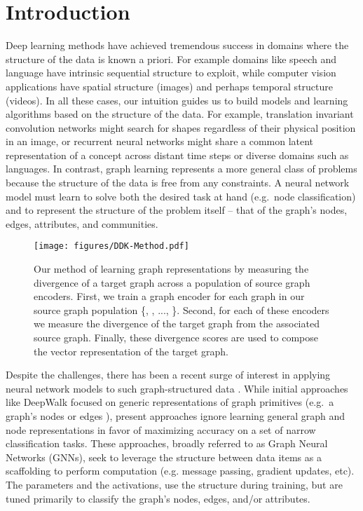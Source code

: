 \documentclass[sigconf]{acmart}
\begin{document}

\maketitle

\section{Introduction}

Deep learning methods have achieved tremendous success in domains where the structure of the data is known a priori.
For example domains like speech and language have intrinsic sequential structure to exploit, while computer vision applications have spatial structure (images) and perhaps temporal structure (videos).
In all these cases, our intuition guides us to build models and learning algorithms based on the structure of the data.
For example, translation invariant convolution networks might search for shapes regardless of their physical position in an image, or recurrent neural networks might share a common latent representation of a concept across distant time steps or diverse domains such as languages.
In contrast, graph learning represents a more general class of problems because the structure of the data is free from any constraints.
A neural network model must learn to solve both the desired task at hand (e.g.\ node classification) and to represent the structure of the problem itself -- that of the graph's nodes, edges, attributes, and communities.

\begin{figure}[t]
\texttt{[image: figures/DDK-Method.pdf]}
\caption{Our method of learning graph representations by measuring the divergence of a target graph across a population of source graph encoders.
First, we train a graph encoder for each graph in our source graph population \{, , ..., \}.
Second, for each of these encoders we measure the divergence of the target graph from the associated source graph.
Finally, these divergence scores are used to compose the vector representation of the target graph.}
\label{fig:method}
\end{figure}

Despite the challenges, there has been a recent surge of interest in applying neural network models to such graph-structured data \cite{deepwalk, kipf-gcn,hamilton2017inductive,velickovic2017graph,zhu2018deep}.
While initial approaches like DeepWalk \cite{deepwalk} focused on generic representations of graph primitives (e.g.\ a graph's nodes \cite{deepwalk} or edges \cite{asymmetric}), present approaches ignore learning general graph and node representations in favor of maximizing accuracy on a set of narrow classification tasks.
These approaches, broadly referred to as Graph Neural Networks (GNNs), seek to leverage the structure between data items as a scaffolding to perform computation (e.g. message passing, gradient updates, etc).
The parameters and the activations, use the structure during training, but are tuned primarily to classify the graph's nodes, edges, and/or attributes.
\end{document}

